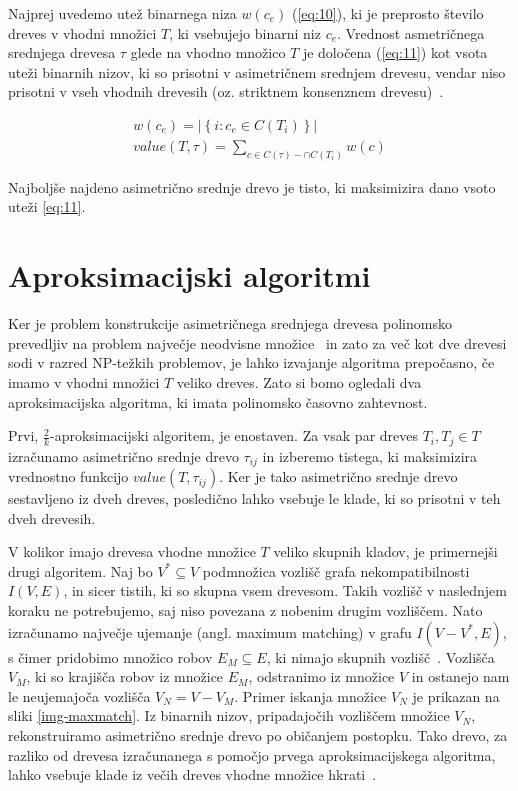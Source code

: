 \documentclass[a4paper, 12pt]{book}
\begin{document}
Najprej uvedemo utež binarnega niza $w(c_e)$ (\ref{eq:10}), ki je preprosto število dreves v vhodni množici $T$, ki vsebujejo binarni niz $c_e$. Vrednost asmetričnega srednjega drevesa $\tau$ glede na vhodno množico $T$ je določena (\ref{eq:11}) kot vsota uteži binarnih nizov, ki so prisotni v asimetričnem srednjem drevesu, vendar niso prisotni v vseh vhodnih drevesih (oz. striktnem konsenznem drevesu)~\cite{pw}.

\begin{align}
	w(c_e) = \left| \left\{ i: c_e \in C(T_i) \right\} \right| \label{eq:10} \\
	value(T, \tau) = \sum_{c \in C(\tau) - \cap C(T_i)} w(c) \label{eq:11}
\end{align}

Najboljše najdeno asimetrično srednje drevo je tisto, ki maksimizira dano vsoto uteži \ref{eq:11}.

\section{Aproksimacijski algoritmi}
Ker je problem konstrukcije asimetričnega srednjega drevesa polinomsko prevedljiv na problem največje neodvisne množice~\cite{pw} in zato za več kot dve drevesi sodi v razred NP-težkih problemov, je lahko izvajanje algoritma prepočasno, če imamo v vhodni množici $T$ veliko dreves. Zato si bomo ogledali dva aproksimacijska algoritma, ki imata polinomsko časovno zahtevnost.

Prvi, $\frac{2}{k}$-aproksimacijski algoritem, je enostaven. Za vsak par dreves $T_i, T_j \in T$ izračunamo asimetrično srednje drevo $\tau_{ij}$ in izberemo tistega, ki maksimizira vrednostno funkcijo $value(T, \tau_{ij})$. Ker je tako asimetrično srednje drevo sestavljeno iz dveh dreves, posledično lahko vsebuje le klade, ki so prisotni v teh dveh drevesih.

V kolikor imajo drevesa vhodne množice $T$ veliko skupnih kladov, je primernejši drugi algoritem. Naj bo $V^* \subseteq V$ podmnožica vozlišč grafa nekompatibilnosti $I(V, E)$, in sicer tistih, ki so skupna vsem drevesom. Takih vozlišč v naslednjem koraku ne potrebujemo, saj niso povezana z nobenim drugim vozliščem. Nato izračunamo največje ujemanje (angl. maximum matching) v grafu $I(V - V^*, E)$, s čimer pridobimo množico robov $E_{M} \subseteq E$, ki nimajo skupnih vozlišč~\cite{mgt}. Vozlišča $V_{M}$, ki so krajišča robov iz množice $E_{M}$, odstranimo iz množice $V$ in ostanejo nam le neujemajoča vozlišča $V_{N} = V - V_{M}$. Primer iskanja množice $V_N$ je prikazan na sliki \ref{img-maxmatch}. Iz binarnih nizov, pripadajočih vozliščem množice $V_{N}$, rekonstruiramo asimetrično srednje drevo po običanjem postopku. Tako drevo, za razliko od drevesa izračunanega s pomočjo prvega aproksimacijskega algoritma, lahko vsebuje klade iz večih dreves vhodne množice hkrati~\cite{pw}. 
\end{document}
